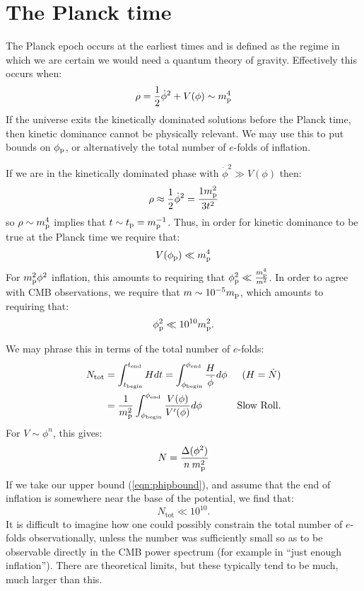 \section{The Planck time}
The Planck epoch occurs at the earliest times and is defined as the
regime in which we are certain we would need a quantum theory of
gravity. Effectively this occurs when:
\begin{equation}
  \rho = \frac{1}{2}\dot\phi^2 + V(\phi)  \sim m_{\mathrm{p}}^4
  \label{eqn:rhosim}
\end{equation}
If the universe exits the kinetically dominated solutions before the
Planck time, then kinetic dominance cannot be physically relevant. We
may use this to put bounds on $\phi_{\mathrm{p}}$, or alternatively the total
number of $e$-folds of inflation.

If we are in the kinetically dominated phase with $\dot{\phi}^2\gg
V(\phi)$ then:
\begin{equation}
              \rho \approx \frac{1}{2}\dot\phi^2= \frac{1m_{\mathrm{p}}^2}{3t^2} 
  \label{eqn:rhop}
\end{equation}
so $\rho\sim m_{\mathrm{p}}^4$ implies that $t\sim t_{\mathrm{p}}=m_{\mathrm{p}}^{-1}$. Thus, in order for
kinetic dominance to be true at the Planck time we require that:
\begin{equation}
  V(\phi_{\mathrm{p}}) \ll m_{\mathrm{p}}^4
\end{equation}
For $m_{\mathrm{p}}^2\phi^2$ inflation, this amounts to requiring that $\phi_{\mathrm{p}}^2\ll
\frac{m_{\mathrm{p}}^4}{m^2}$. In order to agree with CMB observations, we require
that $m\sim10^{-5}m_{\mathrm{p}}$, which amounts to requiring that:
\begin{equation}
 \phi_{\mathrm{p}}^2 \ll 10^{10}m_{\mathrm{p}}^2 \nonumber.
 \label{eqn:phipbound}
\end{equation}

We may phrase this in terms of the total number of $e$-folds:
\begin{align}
  N_\mathrm{tot} 
  &=\int_{t_\mathrm{begin}}^{t_\mathrm{end}} H dt 
  =\int_{\phi_\mathrm{begin}}^{\phi_\mathrm{end}} 
       \frac{H}{\dot{\phi}}d\phi  &\text{($H=\dot{N}$)}
  \\
  &=\frac{1}{m_{\mathrm{p}}^2}\int_{\phi_\mathrm{begin}}^{\phi_\mathrm{end}}
     {\frac{V(\phi)}{V^\prime(\phi)}}d\phi &\text{Slow Roll.}
\end{align}
For $V\sim\phi^n$, this gives:
\begin{equation}
  N = \frac{\Delta (\phi^2) }{n\:m_{\mathrm{p}}^2}
\end{equation}
If we take our upper bound (\ref{eqn:phipbound}), and assume that the
end of inflation is somewhere near the base of the potential, we find
that: 
\begin{equation}
  N_\mathrm{tot}\ll 10^{10}.
\end{equation}
It is difficult to imagine how one could possibly constrain the total
number of $e$-folds observationally, unless the number was
sufficiently small so as to be observable directly in the CMB power
spectrum (for example in ``just enough inflation''). There are
theoretical limits, but these typically tend to be much, much larger
than this.

